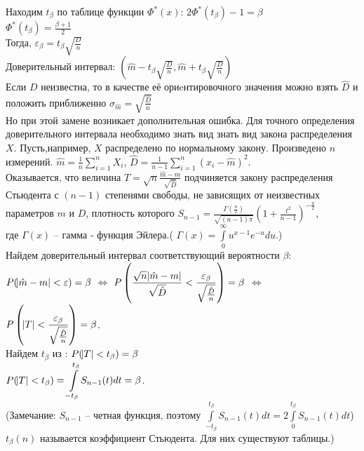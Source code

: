 \documentclass[russian, 12pt, fleqn]{article}
\begin{document}
Находим $t_\beta$ по таблице функции $\Phi^*(x)$: $2\Phi^*(t_\beta) - 1 = \beta$\\
$\Phi^*(t_\beta) = \frac{\beta + 1}{2}$\\
Тогда, $\varepsilon_\beta = t_{\beta} \sqrt{\frac{D}{n}}$\\
Доверительный интервал: $(\hat{m} - t_\beta \sqrt{\frac{D}{n}}, \hat{m} + t_\beta \sqrt{\frac{D}{n}})$\\
Если $D$ неизвестна, то в качестве её ориeнтировочного значения  можно взять $\hat{D}$ и положить приближенно $\sigma_{\hat{m}} = \sqrt{ \frac{\hat{D}}{n} }$\\
Но при этой замене возникает дополнительная ошибка. Для точного определения доверительного интервала необходимо знать вид знать вид закона распределения $X$.
Пусть,например, $X$ 
распределено по нормальному закону. Произведено $n$ измерений. $\hat{m} = \frac{1}{n} \displaystyle{\sum \limits_{i=1} ^ {n} } X_i$, $\hat{D} = \frac{1}{n - 1} \displaystyle{\sum \limits_{i=1} ^ {n} } (x_i - \hat{m})^2$.\\
Оказывается, что величина $T = \sqrt{n} \frac{\hat{m} - m}{\sqrt{\hat{D}}}$ подчиняется закону распределения Стьюдента с $(n-1)$ степенями свободы, не зависящих от неизвестных параметров $m$ и $D$, плотность которого $S_{n-1} = \frac{\Gamma(\frac{n}{2})}{\sqrt{(n-1)\pi}}(1 + \frac{t^2}{n - 1})^{-\frac{n}{2}}$, \\где $\Gamma (x)$ -- гамма - функция Эйлера.( $\Gamma (x) = \displaystyle{\int \limits_{0} ^ {\infty} } u^{x - 1} e ^{-u}du$.)\\
Найдем доверительный интервал соответствующий вероятности $\beta$: \\
$ P(\abs{\hat{m} - m} < \varepsilon) = \beta$ $\Leftrightarrow$ $\displaystyle { P\left (\frac{\sqrt{n} \abs{\hat{m} - m}}{\sqrt{\hat{D}}} < \frac{\varepsilon_\beta}{\sqrt{\frac{\hat{D}}{n}}}\right ) = \beta}$ $\Leftrightarrow$  $\displaystyle { P\left (\abs{T} < \frac{\varepsilon_\beta}{\sqrt{\frac{\hat{D}}{n}}} \right )}= \beta $.\\
Найдем  $t_\beta$ из : $P(\abs{T} < t_\beta) = \beta$\\
$P(\abs{T} < t_\beta) = \displaystyle{\int \limits_{-t_{\beta}}^{t_{\beta}}} S_{n-1}(t) dt = \beta$.\\
(Замечание: $S_{n-1}$ -- четная функция, поэтому  $\displaystyle{\int \limits_{-t_{\beta}}^{t_{\beta}}} S_{n-1}(t) dt =  2\displaystyle{\int \limits_{0}^{t_{\beta}}} S_{n-1}(t) dt$)\\
$t_\beta(n)$ называется коэффициент Стьюдента. Для них существуют таблицы.)\\
\end{document}
